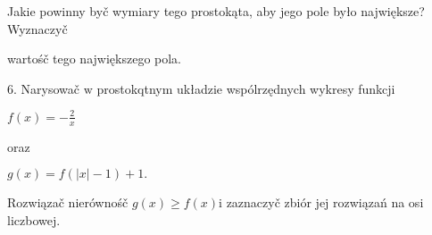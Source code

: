 \documentclass[a4paper,12pt]{article}
\begin{document}
Jakie powinny byč wymiary tego prostokąta, aby jego pole było największe? Wyznaczyč

wartośč tego największego pola.

6. Narysowač $\mathrm{w}$ prostokqtnym układzie wspólrzędnych wykresy funkcji

$f(x)=-\displaystyle \frac{2}{x}$

oraz

$g(x)=f(|x|-1)+1.$

Rozwiązač nierównośč $g(x)\geq f(x)\mathrm{i}$ zaznaczyč zbiór jej rozwiązań na osi liczbowej.
\end{document}
